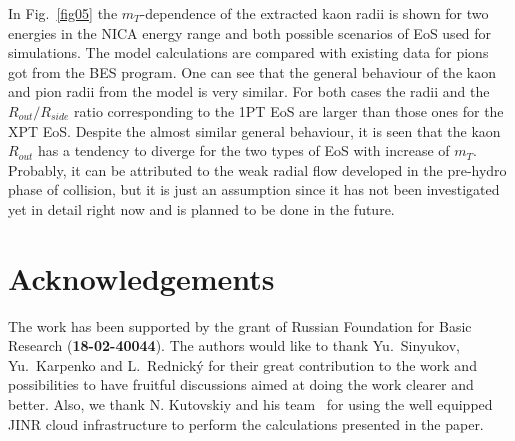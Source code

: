 \documentclass[a4paper]{panl}
\begin{document}
In Fig.~\ref{fig05} the $m_{T}$-dependence of the extracted kaon radii is shown for two energies in the NICA energy range and both possible scenarios of EoS used for simulations.
The model calculations are compared with existing data for pions got from the BES program.
One can see that the general behaviour of the kaon and pion radii from the model is very similar. For both cases the radii and the $R_{out} / R_{side}$ ratio corresponding
to the 1PT EoS are larger than those ones for the XPT EoS. Despite the almost similar general behaviour, it is seen that
the kaon $R_{out}$ has a tendency to diverge for the two types of EoS with increase of $m_{T}$. Probably, it can be attributed to the weak radial flow developed in the pre-hydro phase of
collision, but it is just an assumption since it has not been investigated yet in detail right now and is planned to be done in the future. 
  
\label{sec:Acknowledgements}
\section*{Acknowledgements}
The work has been supported by the grant of Russian Foundation for Basic Research ({\bf 18-02-40044}).
The authors would like to thank Yu.~Sinyukov, Yu.~Karpenko and L.~Rednick\'{y} for their great contribution to the work and possibilities to have fruitful discussions
aimed at doing the work clearer and better.
Also, we thank N. Kutovskiy and his team~\cite{jinrCloud} for using the well equipped JINR cloud infrastructure to perform the calculations presented in the paper.
\end{document}
